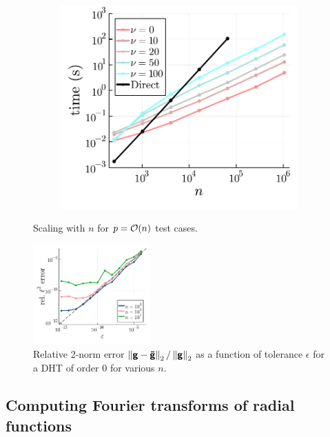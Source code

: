 \begin{figure}
\begin{subfigure}[b]{0.32\textwidth}
  \end{subfigure} 
  \hfill 
  \begin{subfigure}[b]{0.32\textwidth}
    \includegraphics[width=\textwidth]{./figures/nu_scaling.pdf}
  \end{subfigure}
  \caption{Scaling with $n$ for $p = \bO(n)$ test cases.}
  \label{fig:both-scaling}
\end{figure}

\begin{figure}
  \centering
  \includegraphics[width=0.4\textwidth]{./figures/accuracy.pdf}
  \caption{Relative 2-norm error $\norm[2]{\vct{g} - \vct{\tilde{g}}} /
  \norm[2]{\vct{g}}$ as a function of tolerance $\epsilon$ for a DHT of order
  $0$ for various $n$.}
  \label{fig:accuracy}
\end{figure}

\subsection{Computing Fourier transforms of radial functions}

